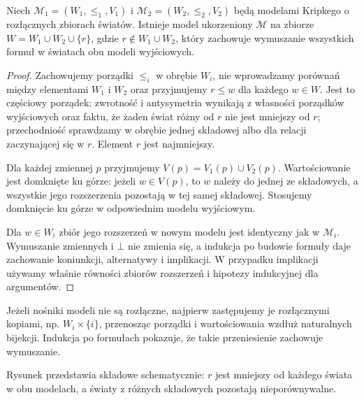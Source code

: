 \begin{lemat}
\label{lem:ncl-ipc-root-amalgamation}
Niech $\mathcal M_1=(W_1,\leq_1,V_1)$ i
$\mathcal M_2=(W_2,\leq_2,V_2)$ będą modelami
Kripkego o rozłącznych zbiorach światów.
Istnieje model ukorzeniony $\mathcal M$ na zbiorze
$W=W_1\cup W_2\cup\{r\}$, gdzie $r\notin W_1\cup W_2$,
który zachowuje wymuszanie wszystkich formuł
w światach obu modeli wyjściowych.
\end{lemat}
\begin{proof}
Zachowujemy porządki $\leq_i$ w obrębie $W_i$,
nie wprowadzamy porównań między elementami
$W_1$ i $W_2$ oraz przyjmujemy $r\leq w$
dla każdego $w\in W$. Jest to częściowy porządek:
zwrotność i antysymetria wynikają z własności
porządków wyjściowych oraz faktu, że żaden świat
różny od $r$ nie jest mniejszy od $r$;
przechodniość sprawdzamy w obrębie jednej
składowej albo dla relacji zaczynającej się w $r$.
Element $r$ jest najmniejszy.

Dla każdej zmiennej $p$ przyjmujemy
$V(p)=V_1(p)\cup V_2(p)$. Wartościowanie jest
domknięte ku górze: jeżeli $w\in V(p)$, to
$w$ należy do jednej ze składowych, a wszystkie
jego rozszerzenia pozostają w tej samej składowej.
Stosujemy domknięcie ku górze w odpowiednim
modelu wyjściowym.

Dla $w\in W_i$ zbiór jego rozszerzeń w nowym
modelu jest identyczny jak w $\mathcal M_i$.
Wymuszanie zmiennych i $\bot$ nie zmienia się,
a indukcja po budowie formuły daje zachowanie
koniunkcji, alternatywy i implikacji. W przypadku
implikacji używamy właśnie równości zbiorów
rozszerzeń i hipotezy indukcyjnej dla argumentów.
\end{proof}
Jeżeli nośniki modeli nie są rozłączne, najpierw
zastępujemy je rozłącznymi kopiami, np.
$W_i\times\{i\}$, przenosząc porządki i wartościowania
wzdłuż naturalnych bijekcji. Indukcja po formułach
pokazuje, że takie przeniesienie zachowuje wymuszanie.

\begin{center}
\end{center}
Rysunek przedstawia składowe schematycznie:
$r$ jest mniejszy od każdego świata w obu modelach,
a światy z różnych składowych pozostają nieporównywalne.

